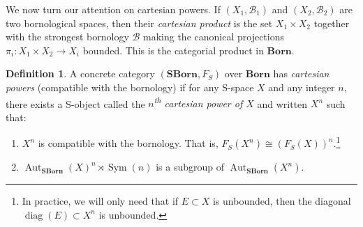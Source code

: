 \documentclass[a4paper]{article}
\theoremstyle{definition}
\newtheorem{defn}[lem]{Definition}
\DeclareMathOperator\Sym{Sym}
\DeclareMathOperator\diag{diag}
\DeclareMathOperator\Aut{Aut}
\DeclareMathOperator\id{id}
\newcommand*{\B}{\mathcal B}
\begin{document}
We now turn our attention on cartesian powers.
If $(X_1,\B_1)$ and $(X_2,\B_2)$ are two bornological spaces, then their \emph{cartesian product} is the set $X_1\times X_2$ together with the strongest bornology $\B$ making the canonical projections $\pi_i\colon X_1\times X_2\to X_i$ bounded.
This is the categorial product in $\mathbf{Born}$.
%
%
\begin{defn}\label{Def:Cartesian}
A concrete category $(\mathbf{SBorn},F_S)$ over $\mathbf{Born}$ has \emph{cartesian powers} (compatible with the bornology) if for any S-space $X$ and any integer $n$, there exists a S-object called the \emph{$n$\textsuperscript{th} cartesian power of $X$} and written $X^n$ such that:
\begin{enumerate}
\item\label{Condidef:2}
$X^n$ is compatible with the bornology. That is, $F_S(X^n)\cong (F_S(X))^n$.\footnote{In practice, we will only need that if $E\subset X$ is unbounded, then the diagonal $\diag(E)\subset X^n$ is unbounded.}
\item\label{Item:Product}
$\Aut_{\mathbf{SBorn}}(X)^n\rtimes \Sym(n)$ is a subgroup of $\Aut_{\mathbf{SBorn}}(X^n)$.
\end{enumerate}

\end{defn}
\end{document}
